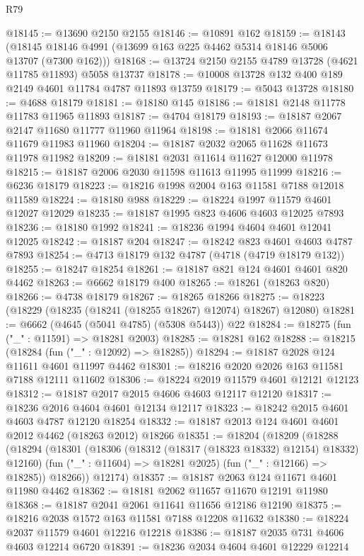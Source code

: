 \begin{lexlean}{R79}
\begin{coremodule}
@18145 := @13690 @2150 @2155
@18146 := @10891 @162
@18159 := @18143
    (@18145 @18146 @4991 (@13699 @163 @225 @4462 @5314 @18146 @5006 @13707 (@7300 @162)))
@18168 := @13724 @2150 @2155 @4789 @13728 (@4621 @11785 @11893) @5058 @13737
@18178 := @10008 @13728 @132 @400 @189 @2149 @4601 @11784 @4787 @11893 @13759
@18179 := @5043 @13728
@18180 := @4688 @18179
@18181 := @18180 @145
@18186 := @18181 @2148 @11778 @11783 @11965 @11893
@18187 := @4704 @18179
@18193 := @18187 @2067 @2147 @11680 @11777 @11960 @11964
@18198 := @18181 @2066 @11674 @11679 @11983 @11960
@18204 := @18187 @2032 @2065 @11628 @11673 @11978 @11982
@18209 := @18181 @2031 @11614 @11627 @12000 @11978
@18215 := @18187 @2006 @2030 @11598 @11613 @11995 @11999
@18216 := @6236 @18179
@18223 := @18216 @1998 @2004 @163 @11581 @7188 @12018 @11589
@18224 := @18180 @988
@18229 := @18224 @1997 @11579 @4601 @12027 @12029
@18235 := @18187 @1995 @823 @4606 @4603 @12025 @7893
@18236 := @18180 @1992
@18241 := @18236 @1994 @4604 @4601 @12041 @12025
@18242 := @18187 @204
@18247 := @18242 @823 @4601 @4603 @4787 @7893
@18254 := @4713 @18179 @132 @4787 (@4718 (@4719 @18179 @132))
@18255 := @18247 @18254
@18261 := @18187 @821 @124 @4601 @4601 @820 @4462
@18263 := @6662 @18179 @400
@18265 := @18261 (@18263 @820)
@18266 := @4738 @18179
@18267 := @18265 @18266
@18275 := @18223 (@18229 (@18235 (@18241 (@18255 @18267) @12074) @18267) @12080)
@18281 := @6662 (@4645 (@5041 @4785) (@5308 @5443)) @22
@18284 := @18275 (fun ("_" : @11591) => @18281 @2003)
@18285 := @18281 @162
@18288 := @18215 (@18284 (fun ("_" : @12092) => @18285))
@18294 := @18187 @2028 @124 @11611 @4601 @11997 @4462
@18301 := @18216 @2020 @2026 @163 @11581 @7188 @12111 @11602
@18306 := @18224 @2019 @11579 @4601 @12121 @12123
@18312 := @18187 @2017 @2015 @4606 @4603 @12117 @12120
@18317 := @18236 @2016 @4604 @4601 @12134 @12117
@18323 := @18242 @2015 @4601 @4603 @4787 @12120 @18254
@18332 := @18187 @2013 @124 @4601 @4601 @2012 @4462 (@18263 @2012) @18266
@18351 := @18204
    (@18209
      (@18288
        (@18294
          (@18301
            (@18306 (@18312 (@18317 (@18323 @18332) @12154) @18332) @12160)
            (fun ("_" : @11604) => @18281 @2025)
            (fun ("_" : @12166) => @18285))
          @18266))
      @12174)
@18357 := @18187 @2063 @124 @11671 @4601 @11980 @4462
@18362 := @18181 @2062 @11657 @11670 @12191 @11980
@18368 := @18187 @2041 @2061 @11641 @11656 @12186 @12190
@18375 := @18216 @2038 @1572 @163 @11581 @7188 @12208 @11632
@18380 := @18224 @2037 @11579 @4601 @12216 @12218
@18386 := @18187 @2035 @731 @4606 @4603 @12214 @6720
@18391 := @18236 @2034 @4604 @4601 @12229 @12214

\end{coremodule}
\end{lexlean}
